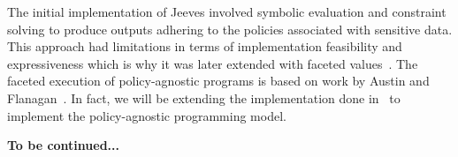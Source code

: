 The initial implementation of Jeeves involved symbolic evaluation and constraint
solving to produce outputs adhering to the policies associated with sensitive data.
This approach had limitations in terms of implementation feasibility and expressiveness
which is why it was later extended with faceted values~\cite{FacetedJeeves}.
The faceted execution of policy-agnostic programs is based on work by Austin and
Flanagan~\cite{Faceted}. In fact, we will be extending the implementation done
in~\cite{Faceted} to implement the policy-agnostic programming model.

\textbf{To be continued...}
